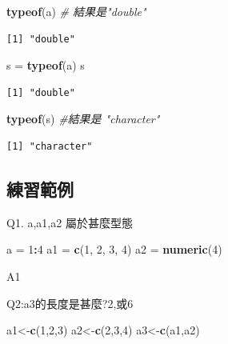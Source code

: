 \documentclass[]{book}
\newenvironment{Shaded}{\begin{snugshade}}{\end{snugshade}}
\newcommand{\CommentTok}[1]{\textcolor[rgb]{0.56,0.35,0.01}{\textit{#1}}}
\newcommand{\DecValTok}[1]{\textcolor[rgb]{0.00,0.00,0.81}{#1}}
\newcommand{\KeywordTok}[1]{\textcolor[rgb]{0.13,0.29,0.53}{\textbf{#1}}}
\newcommand{\NormalTok}[1]{#1}
\newcommand{\OperatorTok}[1]{\textcolor[rgb]{0.81,0.36,0.00}{\textbf{#1}}}
\newcommand{\StringTok}[1]{\textcolor[rgb]{0.31,0.60,0.02}{#1}}
\theoremstyle{definition}
\theoremstyle{definition}
\theoremstyle{definition}
\theoremstyle{remark}
\begin{document}
\begin{Shaded}
\begin{Highlighting}[]
\KeywordTok{typeof}\NormalTok{(a) }\CommentTok{# 結果是"double"}
\end{Highlighting}
\end{Shaded}

\begin{verbatim}
[1] "double"
\end{verbatim}

\begin{Shaded}
\begin{Highlighting}[]
\NormalTok{s =}\StringTok{ }\KeywordTok{typeof}\NormalTok{(a)}
\NormalTok{s}
\end{Highlighting}
\end{Shaded}

\begin{verbatim}
[1] "double"
\end{verbatim}

\begin{Shaded}
\begin{Highlighting}[]
\KeywordTok{typeof}\NormalTok{(s) }\CommentTok{#結果是 "character"}
\end{Highlighting}
\end{Shaded}

\begin{verbatim}
[1] "character"
\end{verbatim}

\subsection{練習範例}

Q1. a,a1,a2 屬於甚麼型態

\begin{Shaded}
\begin{Highlighting}[]
\NormalTok{a =}\StringTok{ }\DecValTok{1}\OperatorTok{:}\DecValTok{4}
\NormalTok{a1 =}\StringTok{ }\KeywordTok{c}\NormalTok{(}\DecValTok{1}\NormalTok{, }\DecValTok{2}\NormalTok{, }\DecValTok{3}\NormalTok{, }\DecValTok{4}\NormalTok{)}
\NormalTok{a2 =}\StringTok{ }\KeywordTok{numeric}\NormalTok{(}\DecValTok{4}\NormalTok{)}
\end{Highlighting}
\end{Shaded}

A1

Q2:a3的長度是甚麼?2,或6

\begin{Shaded}
\begin{Highlighting}[]
\NormalTok{a1<-}\KeywordTok{c}\NormalTok{(}\DecValTok{1}\NormalTok{,}\DecValTok{2}\NormalTok{,}\DecValTok{3}\NormalTok{)}
\NormalTok{a2<-}\KeywordTok{c}\NormalTok{(}\DecValTok{2}\NormalTok{,}\DecValTok{3}\NormalTok{,}\DecValTok{4}\NormalTok{)}
\NormalTok{a3<-}\KeywordTok{c}\NormalTok{(a1,a2)}
\end{Highlighting}
\end{Shaded}
\end{document}
